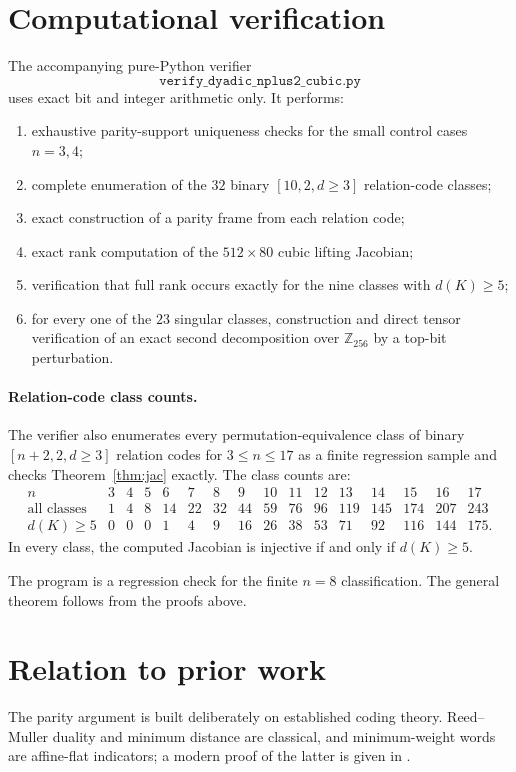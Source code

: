 \documentclass[11pt]{article}
\theoremstyle{definition}
\newcommand{\Z}{\mathbb Z}
\begin{document}
\section{Computational verification}
The accompanying pure-Python verifier
\[
\texttt{verify\_dyadic\_nplus2\_cubic.py}
\]
uses exact bit and integer arithmetic only. It performs:
\begin{enumerate}[leftmargin=*]
\item exhaustive parity-support uniqueness checks for the small control cases \(n=3,4\);
\item complete enumeration of the \(32\) binary \([10,2,d\ge3]\) relation-code classes;
\item exact construction of a parity frame from each relation code;
\item exact rank computation of the \(512\times80\) cubic lifting Jacobian;
\item verification that full rank occurs exactly for the nine classes with \(d(K)\ge5\);
\item for every one of the \(23\) singular classes, construction and direct tensor verification of an exact second decomposition over \(\Z_{256}\) by a top-bit perturbation.
\end{enumerate}



\paragraph{Relation-code class counts.}
The verifier also enumerates every permutation-equivalence class of binary \([n+2,2,d\ge3]\) relation codes for \(3\le n\le17\) as a finite regression sample and checks Theorem~\ref{thm:jac} exactly. The class counts are:
\[
\begin{array}{c|rrrrrrrrrrrrrrr}
n&3&4&5&6&7&8&9&10&11&12&13&14&15&16&17\\ \hline
\text{all classes}&1&4&8&14&22&32&44&59&76&96&119&145&174&207&243\\
d(K)\ge5&0&0&0&1&4&9&16&26&38&53&71&92&116&144&175.
\end{array}
\]
In every class, the computed Jacobian is injective if and only if \(d(K)\ge5\).

The program is a regression check for the finite \(n=8\) classification. The general theorem follows from the proofs above.

\section{Relation to prior work}
The parity argument is built deliberately on established coding theory. Reed--Muller duality and minimum distance are classical, and minimum-weight words are affine-flat indicators; a modern proof of the latter is given in \cite{DelsarteNewProof2012}.
\end{document}
